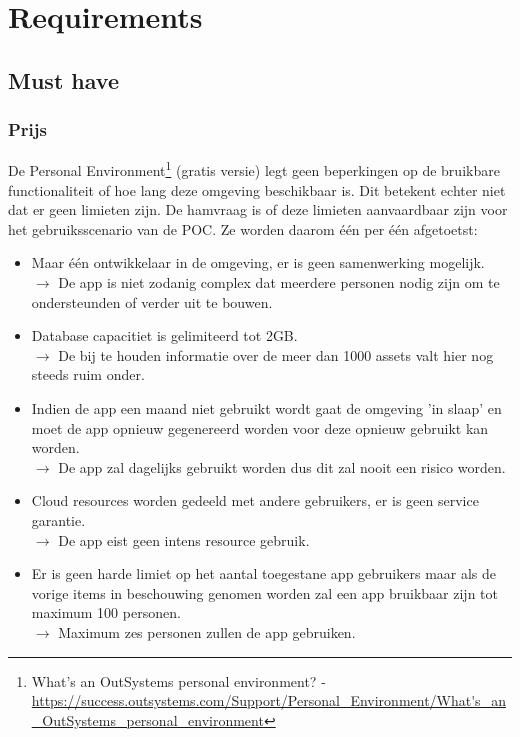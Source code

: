 \section{Requirements}

\subsection{Must have}

\subsubsection{Prijs}
\label{subsec:os-prijs}

De Personal Environment\footnote{What's an OutSystems personal environment? - \url{https://success.outsystems.com/Support/Personal_Environment/What's_an_OutSystems_personal_environment}} (gratis versie) legt geen beperkingen op de bruikbare functionaliteit of hoe lang deze omgeving beschikbaar is. Dit betekent echter niet dat er geen limieten zijn. De hamvraag is of deze limieten aanvaardbaar zijn voor het gebruiksscenario van de POC. Ze worden daarom één per één afgetoetst:

\begin{itemize}
    \item Maar één ontwikkelaar in de omgeving, er is geen samenwerking mogelijk.\\
    $\rightarrow$ De app is niet zodanig complex dat meerdere personen nodig zijn om te ondersteunden of verder uit te bouwen.
    \item Database capacitiet is gelimiteerd tot 2GB.\\
    $\rightarrow$ De bij te houden informatie over de meer dan 1000 assets valt hier nog steeds ruim onder.
    \item Indien de app een maand niet gebruikt wordt gaat de omgeving 'in slaap' en moet de app opnieuw gegenereerd worden voor deze opnieuw gebruikt kan worden.\\
    $\rightarrow$ De app zal dagelijks gebruikt worden dus dit zal nooit een risico worden.
    \item Cloud resources worden gedeeld met andere gebruikers, er is geen service garantie.\\
    $\rightarrow$ De app eist geen intens resource gebruik. 
    \item Er is geen harde limiet op het aantal toegestane app gebruikers maar als de vorige items in beschouwing genomen worden zal een app bruikbaar zijn tot maximum 100 personen.\\
    $\rightarrow$ Maximum zes personen zullen de app gebruiken.
\end{itemize}

